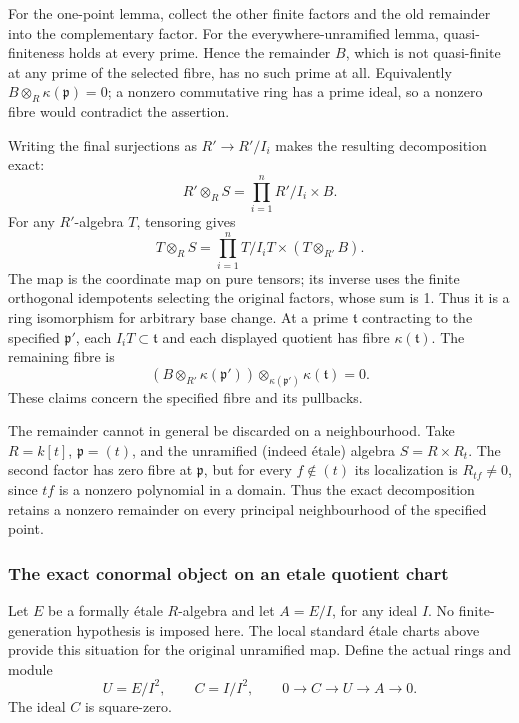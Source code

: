 For the one-point lemma, collect the other finite factors and the old remainder into the complementary factor. For the everywhere-unramified lemma, quasi-finiteness holds at every prime. Hence the remainder \(B\), which is not quasi-finite at any prime of the selected fibre, has no such prime at all. Equivalently \(B\otimes_R\kappa(\mathfrak p)=0\); a nonzero commutative ring has a prime ideal, so a nonzero fibre would contradict the assertion.

Writing the final surjections as \(R'\to R'/I_i\) makes the resulting decomposition exact: \[
R'\otimes_RS=\prod_{i=1}^n R'/I_i\times B.
\] For any \(R'\)-algebra \(T\), tensoring gives \[
T\otimes_RS=\prod_{i=1}^n T/I_iT\times(T\otimes_{R'}B).
\] The map is the coordinate map on pure tensors; its inverse uses the finite orthogonal idempotents selecting the original factors, whose sum is 1. Thus it is a ring isomorphism for arbitrary base change. At a prime \(\mathfrak t\) contracting to the specified \(\mathfrak p'\), each \(I_iT\subset\mathfrak t\) and each displayed quotient has fibre \(\kappa(\mathfrak t)\). The remaining fibre is \[
(B\otimes_{R'}\kappa(\mathfrak p'))
   \otimes_{\kappa(\mathfrak p')}\kappa(\mathfrak t)=0.
\] These claims concern the specified fibre and its pullbacks.

The remainder cannot in general be discarded on a neighbourhood. Take \(R=k[t]\), \(\mathfrak p=(t)\), and the unramified (indeed étale) algebra \(S=R\times R_t\). The second factor has zero fibre at \(\mathfrak p\), but for every \(f\notin(t)\) its localization is \(R_{tf}\ne0\), since \(tf\) is a nonzero polynomial in a domain. Thus the exact decomposition retains a nonzero remainder on every principal neighbourhood of the specified point.

\subsubsection{The exact conormal object on an etale quotient chart}\label{algebra-proof-057-the-exact-conormal-object-on-an-etale-quotient-chart}

Let \(E\) be a formally étale \(R\)-algebra and let \(A=E/I\), for any ideal \(I\). No finite-generation hypothesis is imposed here. The local standard étale charts above provide this situation for the original unramified map. Define the actual rings and module \[
U=E/I^2,\qquad C=I/I^2,\qquad
0\longrightarrow C\longrightarrow U\longrightarrow A
\longrightarrow0.
\] The ideal \(C\) is square-zero.


